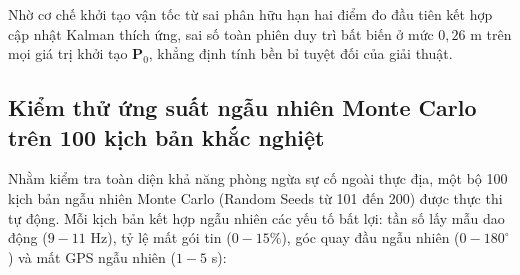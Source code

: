 \begin{table}[H]
\centering
\caption{Độ nhạy của thời gian hội tụ và RMSE theo giá trị khởi tạo ma trận $\mathbf{P}_0$}
\label{tab:p0-sensitivity-matrix-table}
\end{table}

Nhờ cơ chế khởi tạo vận tốc từ sai phân hữu hạn hai điểm đo đầu tiên kết hợp cập nhật Kalman thích ứng, sai số toàn phiên duy trì bất biến ở mức $0{,}26$ m trên mọi giá trị khởi tạo $\mathbf{P}_0$, khẳng định tính bền bỉ tuyệt đối của giải thuật.

\subsection{Kiểm thử ứng suất ngẫu nhiên Monte Carlo trên 100 kịch bản khắc nghiệt}

\hspace{0.5cm} Nhằm kiểm tra toàn diện khả năng phòng ngừa sự cố ngoài thực địa, một bộ 100 kịch bản ngẫu nhiên Monte Carlo (Random Seeds từ 101 đến 200) được thực thi tự động. Mỗi kịch bản kết hợp ngẫu nhiên các yếu tố bất lợi: tần số lấy mẫu dao động ($9 - 11$ Hz), tỷ lệ mất gói tin ($0 - 15\%$), góc quay đầu ngẫu nhiên ($0 - 180^\circ$) và mất GPS ngẫu nhiên ($1 - 5$ s):

